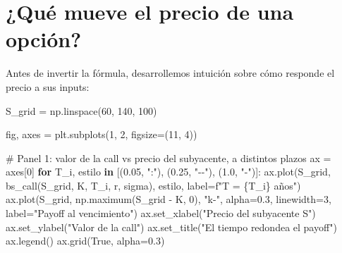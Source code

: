 \documentclass[
  spanish,
  letterpaper,
  DIV=11,
  numbers=noendperiod]{scrreprt}
\newenvironment{Shaded}{\begin{snugshade}}{\end{snugshade}}
\newcommand{\CommentTok}[1]{\textcolor[rgb]{0.37,0.37,0.37}{#1}}
\newcommand{\ControlFlowTok}[1]{\textcolor[rgb]{0.00,0.23,0.31}{\textbf{#1}}}
\newcommand{\DecValTok}[1]{\textcolor[rgb]{0.68,0.00,0.00}{#1}}
\newcommand{\FloatTok}[1]{\textcolor[rgb]{0.68,0.00,0.00}{#1}}
\newcommand{\KeywordTok}[1]{\textcolor[rgb]{0.00,0.23,0.31}{\textbf{#1}}}
\newcommand{\NormalTok}[1]{\textcolor[rgb]{0.00,0.23,0.31}{#1}}
\newcommand{\OperatorTok}[1]{\textcolor[rgb]{0.37,0.37,0.37}{#1}}
\newcommand{\SpecialCharTok}[1]{\textcolor[rgb]{0.37,0.37,0.37}{#1}}
\newcommand{\SpecialStringTok}[1]{\textcolor[rgb]{0.13,0.47,0.30}{#1}}
\newcommand{\StringTok}[1]{\textcolor[rgb]{0.13,0.47,0.30}{#1}}
\newcommand{\VariableTok}[1]{\textcolor[rgb]{0.07,0.07,0.07}{#1}}
\begin{document}
\section{¿Qué mueve el precio de una
opción?}\label{quuxe9-mueve-el-precio-de-una-opciuxf3n}

Antes de invertir la fórmula, desarrollemos intuición sobre cómo
responde el precio a sus inputs:

\begin{Shaded}
\begin{Highlighting}[]
\NormalTok{S\_grid }\OperatorTok{=}\NormalTok{ np.linspace(}\DecValTok{60}\NormalTok{, }\DecValTok{140}\NormalTok{, }\DecValTok{100}\NormalTok{)}

\NormalTok{fig, axes }\OperatorTok{=}\NormalTok{ plt.subplots(}\DecValTok{1}\NormalTok{, }\DecValTok{2}\NormalTok{, figsize}\OperatorTok{=}\NormalTok{(}\DecValTok{11}\NormalTok{, }\DecValTok{4}\NormalTok{))}

\CommentTok{\# Panel 1: valor de la call vs precio del subyacente, a distintos plazos}
\NormalTok{ax }\OperatorTok{=}\NormalTok{ axes[}\DecValTok{0}\NormalTok{]}
\ControlFlowTok{for}\NormalTok{ T\_i, estilo }\KeywordTok{in}\NormalTok{ [(}\FloatTok{0.05}\NormalTok{, }\StringTok{":"}\NormalTok{), (}\FloatTok{0.25}\NormalTok{, }\StringTok{"{-}{-}"}\NormalTok{), (}\FloatTok{1.0}\NormalTok{, }\StringTok{"{-}"}\NormalTok{)]:}
\NormalTok{    ax.plot(S\_grid, bs\_call(S\_grid, K, T\_i, r, sigma), estilo,}
\NormalTok{            label}\OperatorTok{=}\SpecialStringTok{f"T = }\SpecialCharTok{\{}\NormalTok{T\_i}\SpecialCharTok{\}}\SpecialStringTok{ años"}\NormalTok{)}
\NormalTok{ax.plot(S\_grid, np.maximum(S\_grid }\OperatorTok{{-}}\NormalTok{ K, }\DecValTok{0}\NormalTok{), }\StringTok{"k{-}"}\NormalTok{, alpha}\OperatorTok{=}\FloatTok{0.3}\NormalTok{, linewidth}\OperatorTok{=}\DecValTok{3}\NormalTok{,}
\NormalTok{        label}\OperatorTok{=}\StringTok{"Payoff al vencimiento"}\NormalTok{)}
\NormalTok{ax.set\_xlabel(}\StringTok{"Precio del subyacente S"}\NormalTok{)}
\NormalTok{ax.set\_ylabel(}\StringTok{"Valor de la call"}\NormalTok{)}
\NormalTok{ax.set\_title(}\StringTok{"El tiempo \textquotesingle{}redondea\textquotesingle{} el payoff"}\NormalTok{)}
\NormalTok{ax.legend()}
\NormalTok{ax.grid(}\VariableTok{True}\NormalTok{, alpha}\OperatorTok{=}\FloatTok{0.3}\NormalTok{)}


\end{Highlighting}
\end{Shaded}
\end{document}
